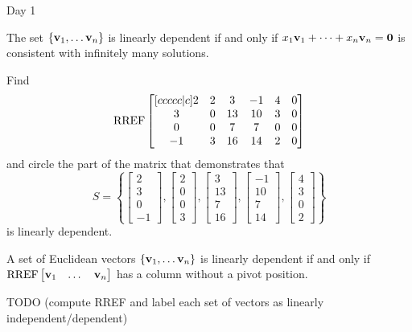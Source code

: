 \begin{applicationActivities}{Day 1}
\begin{fact}
  The set \(\{\mathbf v_1,\dots\mathbf v_n\}\) is linearly dependent if and only
  if \(x_1\mathbf v_1+\dots+x_n\mathbf v_n=\mathbf 0\) is consistent with
  infinitely many solutions.
\end{fact}

\begin{activity}{10}
  Find
  \[\operatorname{RREF}\begin{bmatrix}[ccccc|c]
  2&2&3&-1&4&0\\
  3&0&13&10&3&0\\
  0&0&7&7&0&0\\
  -1&3&16&14&2&0
  \end{bmatrix}
  \]
  and circle the part of the matrix that demonstrates that
  \[S=\left\{
  \begin{bmatrix}2\\3\\0\\-1\end{bmatrix},
  \begin{bmatrix}2\\0\\0\\3\end{bmatrix},
  \begin{bmatrix}3\\13\\7\\16\end{bmatrix},
  \begin{bmatrix}-1\\10\\7\\14\end{bmatrix},
  \begin{bmatrix}4\\3\\0\\2\end{bmatrix}
  \right\}
  \]
  is linearly dependent.
\end{activity}

\begin{fact}
  A set of Euclidean vectors
  \(\{\mathbf v_1,\dots\mathbf v_n\}\) is linearly dependent if and only
  if \(\operatorname{RREF}\begin{bmatrix}\mathbf v_1&\dots&\mathbf v_n\end{bmatrix}\)
  has a column without a pivot position.
\end{fact}

\begin{activity}{15} TODO
  (compute RREF and label each set of vectors as linearly independent/dependent)
\end{activity}

\end{applicationActivities}
